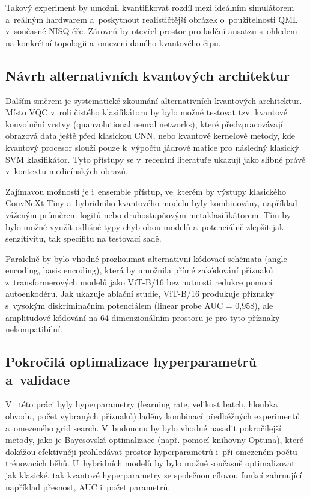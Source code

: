 \documentclass[12pt, a4paper]{report}
\begin{document}
Takový experiment by umožnil kvantifikovat rozdíl mezi ideálním simulátorem a~reálným hardwarem a~poskytnout realističtější obrázek o~použitelnosti QML v~současné NISQ éře. Zároveň by otevřel prostor pro ladění ansatzu s~ohledem na konkrétní topologii a~omezení daného kvantového čipu.

\subsection{Návrh alternativních kvantových architektur}

Dalším směrem je systematické zkoumání alternativních kvantových architektur. Místo VQC v~roli čistého klasifikátoru by bylo možné testovat tzv. kvantové konvoluční vrstvy (quanvolutional neural networks), které předzpracovávají obrazová data ještě před klasickou CNN, nebo kvantové kernelové metody, kde kvantový procesor slouží pouze k~výpočtu jádrové matice pro následný klasický SVM klasifikátor. Tyto přístupy se v~recentní literatuře ukazují jako slibné právě v~kontextu medicínských obrazů.

Zajímavou možností je i~ensemble přístup, ve~kterém by výstupy klasického ConvNeXt-Tiny a~hybridního kvantového modelu byly kombinovány, například váženým průměrem logitů nebo druhostupňovým metaklasifikátorem. Tím by bylo možné využít odlišné typy chyb obou modelů a~potenciálně zlepšit jak senzitivitu, tak specifitu na testovací sadě.

Paralelně by bylo vhodné prozkoumat alternativní kódovací schémata (angle encoding, basis encoding), která by umožnila přímé zakódování příznaků z~transformerových modelů jako ViT-B/16 bez nutnosti redukce pomocí autoenkodéru. Jak ukazuje ablační studie, ViT-B/16 produkuje příznaky s~vysokým diskriminačním potenciálem (linear probe AUC = 0{,}958), ale amplitudové kódování na 64-dimenzionálním prostoru je pro tyto příznaky nekompatibilní.

\subsection{Pokročilá optimalizace hyperparametrů a~validace}

V ~této práci byly hyperparametry (learning rate, velikost batch, hloubka obvodu, počet vybraných příznaků) laděny kombinací předběžných experimentů a~omezeného grid search. V~budoucnu by bylo vhodné nasadit pokročilejší metody, jako je Bayesovská optimalizace (např. pomocí knihovny Optuna), které dokážou efektivněji prohledávat prostor hyperparametrů i~při omezeném počtu trénovacích běhů. U~hybridních modelů by bylo možné současně optimalizovat jak klasické, tak kvantové hyperparametry se společnou cílovou funkcí zahrnující například přesnost, AUC i~počet parametrů.
\end{document}
